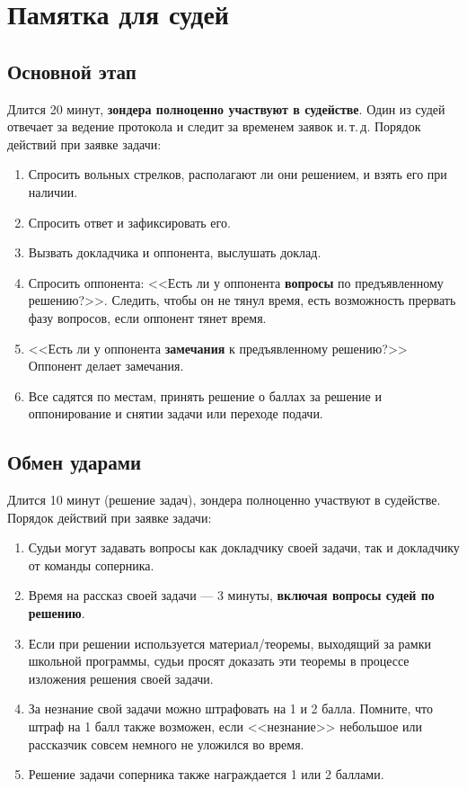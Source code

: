 \documentclass[12pt]{article}
\begin{document}
\section*{Памятка для судей}
\subsection*{Основной этап}
Длится 20 минут, {\bf зондера полноценно участвуют в судействе}. Один из судей отвечает за ведение протокола и следит за временем заявок и.\,т.\,д.
Порядок действий при заявке задачи:
\begin{enumerate}
	\item Спросить вольных стрелков, располагают ли они решением, и взять его при наличии.
	\item Спросить ответ и зафиксировать его.
	\item Вызвать докладчика и оппонента, выслушать доклад.
	\item Спросить оппонента: <<Есть ли у оппонента {\bf вопросы} по предъявленному решению?>>. Следить, чтобы он не тянул время, есть возможность прервать фазу вопросов, если оппонент тянет время.
	\item <<Есть ли у оппонента {\bf замечания} к предъявленному решению?>> Оппонент делает замечания.
	\item Все садятся по местам, принять решение о баллах за решение и оппонирование и снятии задачи или переходе подачи.
\end{enumerate}

\subsection*{Обмен ударами}
Длится 10 минут (решение задач), зондера полноценно участвуют в судействе.
Порядок действий при заявке задачи:
\begin{enumerate}
	\item Судьи могут задавать вопросы как докладчику своей задачи, так и докладчику от команды соперника.
	\item Время на рассказ своей задачи --- 3 минуты, {\bf включая вопросы судей по решению}.
	\item Если при решении используется материал/теоремы, выходящий за рамки школьной программы, судьи просят доказать эти теоремы в процессе изложения решения своей задачи. 
	\item За незнание свой задачи можно штрафовать на 1 и 2 балла. Помните, что штраф на 1 балл также возможен, если <<незнание>> небольшое или рассказчик совсем немного не уложился во время.
	\item Решение задачи соперника также награждается 1 или 2 баллами.
\end{enumerate}
\end{document}

